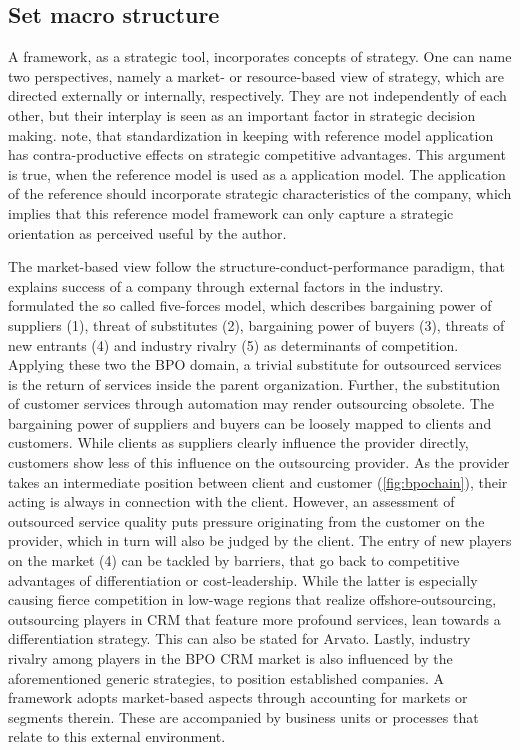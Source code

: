	
	
	\subsection{Set macro structure}
	
	A framework, as a strategic tool, incorporates concepts of strategy. One can name two perspectives, namely a market- or resource-based view of strategy, which are directed externally or internally, respectively. They are not independently of each other, but their interplay is seen as an important factor in strategic decision making. \cite{becker2004handelsinformationssysteme} note, that standardization in keeping with reference model application has contra-productive effects on strategic competitive advantages. This argument is true, when the reference model is used as a application model. The application of the reference should incorporate strategic characteristics of the company, which implies that this reference model framework can only capture a strategic orientation as perceived useful by the author. 
	
	The market-based view follow the structure-conduct-performance paradigm, that explains success of a company through external factors in the industry. \cite{porter1980} formulated the so called five-forces model, which describes bargaining power of suppliers (1), threat of substitutes (2), bargaining power of buyers (3), threats of new entrants (4) and industry rivalry (5) as determinants of competition. Applying these two the BPO domain, a trivial substitute for outsourced services is the return of services inside the parent organization. Further, the substitution of customer services through automation may render outsourcing obsolete. The bargaining power of suppliers and buyers can be loosely mapped to clients and customers. While clients as suppliers clearly influence the provider directly, customers show less of this influence on the outsourcing provider. As the provider takes an intermediate position between client and customer (\cf \Fig \ref{fig:bpochain}), their acting is always in connection with the client. However, an assessment of outsourced service quality puts pressure originating from the customer on the provider, which in turn will also be judged by the client. The entry of new players on the market (4) can be tackled by barriers, that go back to competitive advantages of differentiation or cost-leadership. While the latter is especially causing fierce competition in low-wage regions that realize offshore-outsourcing, outsourcing players in CRM that feature more profound services, lean towards a differentiation strategy. This can also be stated for Arvato. Lastly, industry rivalry among players in the BPO CRM market is also influenced by the aforementioned generic strategies, to position established companies. A framework adopts market-based aspects through accounting for markets or segments therein. These are accompanied by business units or processes that relate to this external environment. 
	
